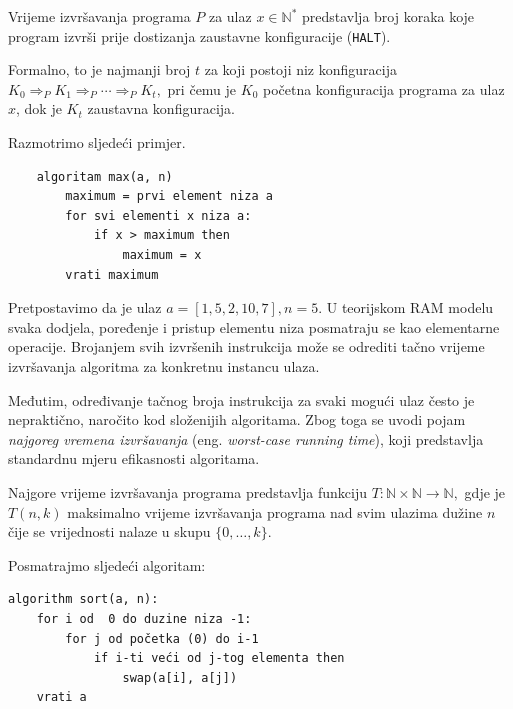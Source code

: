 \begin{definition}
	Vrijeme izvršavanja programa $P$ za ulaz $x \in \mathbb{N}^*$ predstavlja broj koraka koje program izvrši prije dostizanja zaustavne konfiguracije (\texttt{HALT}).
	
	Formalno, to je najmanji broj $t$ za koji postoji niz konfiguracija $
	K_0 \Rightarrow_P K_1 \Rightarrow_P \cdots \Rightarrow_P K_t,
	$ pri čemu je $K_0$ početna konfiguracija programa za ulaz $x$, dok je $K_t$ zaustavna konfiguracija.
\end{definition}

Razmotrimo sljedeći primjer.

\begin{verbatim}
	algoritam max(a, n)
	    maximum = prvi element niza a
	    for svi elementi x niza a:
	        if x > maximum then
	            maximum = x
	    vrati maximum
\end{verbatim}

Pretpostavimo da je ulaz $a=[1,5,2,10,7], n=5.$ U teorijskom RAM modelu svaka dodjela, poređenje i pristup elementu niza posmatraju se kao elementarne operacije. Brojanjem svih izvršenih instrukcija može se odrediti tačno vrijeme izvršavanja algoritma za konkretnu instancu ulaza.

Međutim, određivanje tačnog broja instrukcija za svaki mogući ulaz često je nepraktično, naročito kod složenijih algoritama. Zbog toga se uvodi pojam \textit{najgoreg vremena izvršavanja} (eng. \textit{worst-case running time}), koji predstavlja standardnu mjeru efikasnosti algoritama.

\begin{definition}
	Najgore vrijeme izvršavanja programa predstavlja funkciju $
	T : \mathbb{N}\times\mathbb{N}\rightarrow\mathbb{N},
	$ gdje je $T(n,k)$ maksimalno vrijeme izvršavanja programa nad svim ulazima dužine $n$ čije se vrijednosti nalaze u skupu $\{0,\ldots,k\}$.
\end{definition}

\begin{example}
	Posmatrajmo sljedeći algoritam:

\begin{verbatim}
algorithm sort(a, n): 
    for i od  0 do duzine niza -1:
		for j od početka (0) do i-1  
		    if i-ti veći od j-tog elementa then
		        swap(a[i], a[j])
    vrati a	
\end{verbatim}
	
\end{example}

